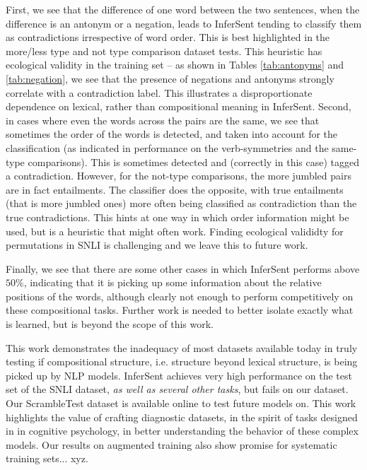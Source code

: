 \documentclass[10pt,letterpaper]{article}
\begin{document}
First, we see that the difference of one word between the two sentences, when the difference is an antonym or a negation, leads to InferSent tending to classify them as contradictions irrespective of word order. This is best highlighted in the more/less type and not type comparison dataset tests. This heuristic has ecological validity in the training set – as shown in Tables \ref{tab:antonyms} and \ref{tab:negation}, we see that the presence of negations and antonyms strongly correlate with a contradiction label. This illustrates a disproportionate dependence on lexical, rather than compositional meaning in InferSent. 
Second, in cases where even the words across the pairs are the same, we see that sometimes the order of the words is detected, and taken into account for the classification (as indicated in performance on the verb-symmetries and the same-type comparisons). This is sometimes detected and (correctly in this case) tagged a contradiction. However, for the not-type comparisons, the more jumbled pairs are in fact entailments. The classifier does the opposite, with true entailments (that is more jumbled ones) more often being classified as contradiction than the true contradictions. This hints at one way in which order information might be used, but is a heuristic that might often work. Finding ecological valididty for permutations in SNLI is challenging and we leave this to future work.

Finally, we see that there are some other cases in which InferSent performs above $50\%$, indicating that it is picking up some information about the relative positions of the words, although clearly not enough to perform competitively on these compositional tasks. Further work is needed to better isolate exactly what is learned, but is beyond the scope of this work.

This work demonstrates the inadequacy of most datasets available today in truly testing if compositional structure, i.e. structure beyond lexical structure, is being picked up by NLP models. InferSent achieves very high performance on the test set of the SNLI dataset, \textit{as well as several other tasks}, but fails on our dataset. Our ScrambleTest dataset is available online to test future models on. This work highlights the value of crafting diagnostic datasets, in the spirit of tasks designed in in cognitive psychology, in better understanding the behavior of these complex models. Our results on augmented training also show promise for systematic training sets... xyz.
\end{document}
